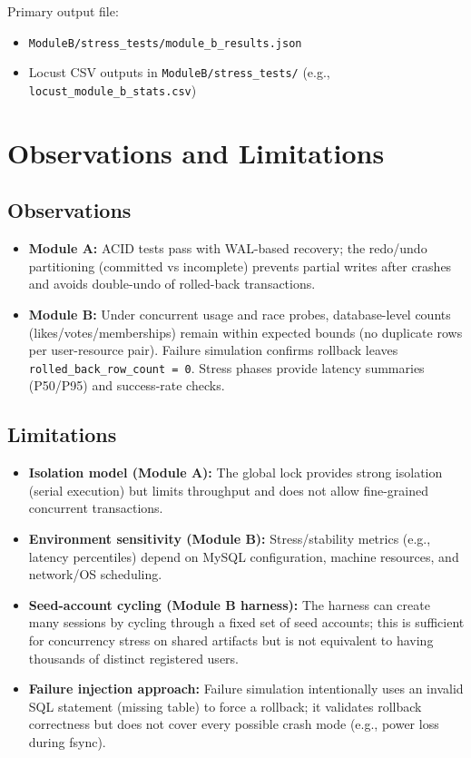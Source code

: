 \documentclass[12pt,a4paper]{article}
\begin{document}
Primary output file:
\begin{itemize}[noitemsep]
  \item \texttt{ModuleB/stress\_tests/module\_b\_results.json}
  \item Locust CSV outputs in \texttt{ModuleB/stress\_tests/} (e.g., \texttt{locust\_module\_b\_stats.csv})
\end{itemize}

\section{Observations and Limitations}

\subsection{Observations}
\begin{itemize}[noitemsep]
  \item \textbf{Module A:} ACID tests pass with WAL-based recovery; the redo/undo partitioning (committed vs incomplete) prevents partial writes after crashes and avoids double-undo of rolled-back transactions.
  \item \textbf{Module B:} Under concurrent usage and race probes, database-level counts (likes/votes/memberships) remain within expected bounds (no duplicate rows per user-resource pair). Failure simulation confirms rollback leaves \texttt{rolled\_back\_row\_count = 0}. Stress phases provide latency summaries (P50/P95) and success-rate checks.
\end{itemize}

\subsection{Limitations}
\begin{itemize}[noitemsep]
  \item \textbf{Isolation model (Module A):} The global lock provides strong isolation (serial execution) but limits throughput and does not allow fine-grained concurrent transactions.
  \item \textbf{Environment sensitivity (Module B):} Stress/stability metrics (e.g., latency percentiles) depend on MySQL configuration, machine resources, and network/OS scheduling.
  \item \textbf{Seed-account cycling (Module B harness):} The harness can create many sessions by cycling through a fixed set of seed accounts; this is sufficient for concurrency stress on shared artifacts but is not equivalent to having thousands of distinct registered users.
  \item \textbf{Failure injection approach:} Failure simulation intentionally uses an invalid SQL statement (missing table) to force a rollback; it validates rollback correctness but does not cover every possible crash mode (e.g., power loss during fsync).
\end{itemize}
\end{document}
